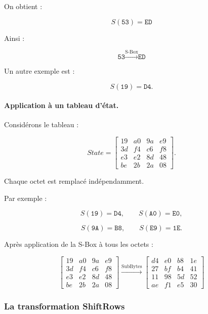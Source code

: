 \documentclass[12pt,a4paper]{article}
\begin{document}
On obtient :

\[
\boxed{
S(\texttt{53})=\texttt{ED}
}
\]

Ainsi :

\[
\boxed{
\texttt{53}
\xrightarrow{\text{S-Box}}
\texttt{ED}
}
\]

Un autre exemple est :

\[
S(\texttt{19})=\texttt{D4}.
\]



\paragraph{Application à un tableau d'état.}

Considérons le tableau :

\[
State=
\begin{bmatrix}
19&a0&9a&e9\\
3d&f4&c6&f8\\
e3&e2&8d&48\\
be&2b&2a&08
\end{bmatrix}.
\]

Chaque octet est remplacé indépendamment.

Par exemple :

\[
S(\texttt{19})=\texttt{D4},
\qquad
S(\texttt{A0})=\texttt{E0},
\]

\[
S(\texttt{9A})=\texttt{B8},
\qquad
S(\texttt{E9})=\texttt{1E}.
\]

Après application de la S-Box à tous les octets :

\[
\boxed{
\begin{bmatrix}
19&a0&9a&e9\\
3d&f4&c6&f8\\
e3&e2&8d&48\\
be&2b&2a&08
\end{bmatrix}
\overset{\text{SubBytes}}{\longrightarrow}
\begin{bmatrix}
d4&e0&b8&1e\\
27&bf&b4&41\\
11&98&5d&52\\
ae&f1&e5&30
\end{bmatrix}
}
\]



\subsubsection{La transformation ShiftRows}
\end{document}
